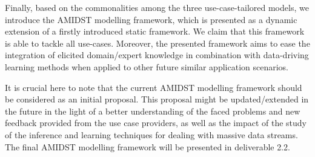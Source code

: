 
Finally, based on the commonalities among the three use-case-tailored models, we introduce the AMIDST modelling framework, which is presented as a dynamic extension of a firstly introduced static framework. We claim that this framework is able to tackle all use-cases. Moreover, the presented framework aims to ease the integration of elicited domain/expert knowledge in combination with data-driving learning methods when applied to other future similar application scenarios. 


It is crucial here to note that the current AMIDST modelling framework should be considered as an initial proposal. This proposal might be updated/extended in the future in the light of a better understanding of the faced problems and new feedback provided from the use case providers, as well as the impact of the study of the inference and learning techniques for dealing with massive data streams. The final AMIDST modelling framework will be presented in deliverable 2.2.


